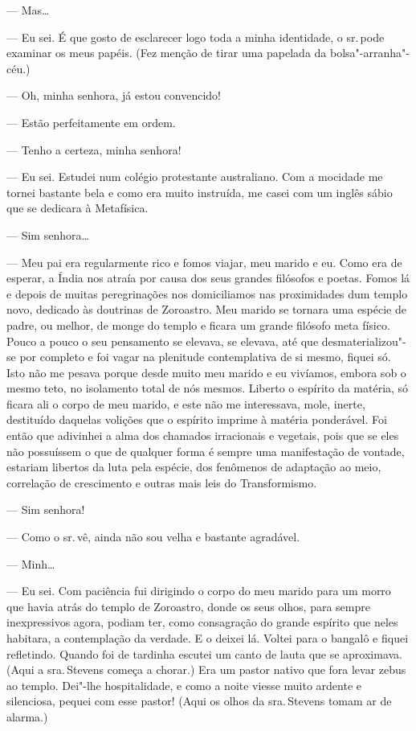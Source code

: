--- Mas\ldots{}

--- Eu sei. É que gosto de esclarecer logo toda a minha identidade, o
sr.\,pode examinar os meus papéis. (Fez menção de tirar uma papelada da
bolsa"-arranha"-céu.)

--- Oh, minha senhora, já estou convencido!

--- Estão perfeitamente em ordem.

--- Tenho a certeza, minha senhora!

--- Eu sei. Estudei num colégio protestante australiano. Com a mocidade
me tornei bastante bela e como era muito instruída, me casei com um
inglês sábio que se dedicara à Metafísica.

--- Sim senhora\ldots{}

--- Meu pai era regularmente rico e fomos viajar, meu marido e eu. Como
era de esperar, a Índia nos atraía por causa dos seus grandes filósofos
e poetas. Fomos lá e depois de muitas peregrinações nos domiciliamos nas
proximidades dum templo novo, dedicado às doutrinas de Zoroastro. Meu
marido se tornara uma espécie de padre, ou melhor, de monge do templo e
ficara um grande filósofo meta físico. Pouco a pouco o seu pensamento se
elevava, se elevava, até que desmaterializou"-se por completo e foi vagar
na plenitude contemplativa de si mesmo, fiquei só. Isto não me pesava
porque desde muito meu marido e eu vivíamos, embora sob o mesmo teto, no
isolamento total de nós mesmos. Liberto o espírito da matéria, só ficara
ali o corpo de meu marido, e este não me interessava, mole, inerte,
destituído daquelas volições que o espírito imprime à matéria
ponderável. Foi então que adivinhei a alma dos chamados irracionais e
vegetais, pois que se eles não possuíssem o que de qualquer forma é
sempre uma manifestação de vontade, estariam libertos da luta pela
espécie, dos fenômenos de adaptação ao meio, correlação de crescimento e
outras mais leis do Transformismo.

--- Sim senhora!

--- Como o sr.\,vê, ainda não sou velha e bastante agradável.

--- Minh\ldots{}

--- Eu sei. Com paciência fui dirigindo o corpo do meu marido para um
morro que havia atrás do templo de Zoroastro, donde os seus olhos, para
sempre inexpressivos agora, podiam ter, como consagração do grande
espírito que neles habitara, a contemplação da verdade. E o deixei lá.
Voltei para o bangalô e fiquei refletindo. Quando foi de tardinha
escutei um canto de lauta que se aproximava. (Aqui a sra.\,Stevens começa
a chorar.) Era um pastor nativo que fora levar zebus ao templo. Dei"-lhe
hospitalidade, e como a noite viesse muito ardente e silenciosa, pequei
com esse pastor! (Aqui os olhos da sra.\,Stevens tomam ar de alarma.)

